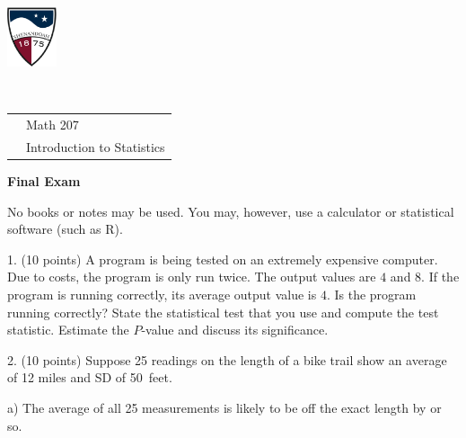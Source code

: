 \documentclass[10pt]{article}
\begin{document}
\pagestyle{empty}
\lstset{language=R, showspaces=false, showstringspaces=false}



\href{http://www.su.edu}{\includegraphics[height=1.75cm]{sulogo.eps}}
\vspace{-1.69cm}

{{\ }\hfill\small
\begin{tabular}{cl}
& Math 207\\
& Introduction to Statistics\\
\end{tabular}
}
\setlength{\baselineskip}{1.05\baselineskip}

\begin{center}
\textbf{\large  Final Exam}
\end{center}
No books or notes  may be used. You may, however, use a calculator or statistical software (such as R).
\medskip

1. (10 points)  A program is being tested on an extremely expensive computer.  
Due to costs, the program is only run twice.  The output values are $4$ and $8$.
If the  program is running correctly, its average output value is $4$.
Is the program running correctly?  State the statistical test that you use and
compute the test statistic.  Estimate the $P$-value and discuss its significance.
\vspace{3.7in}


2. (10 points)
Suppose 25 readings on the length of a bike trail show an average of 12 miles and  SD
of 50~feet.
\medskip

\hspace{10pt} a) The average of all 25 measurements is likely to be off
the exact length by \underline{\hspace{1in}} or so.
\vspace{0.7in}
%
\end{document}
